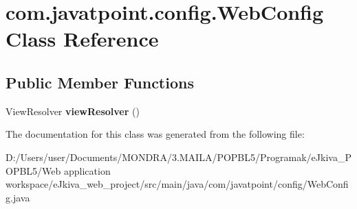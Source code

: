 \hypertarget{classcom_1_1javatpoint_1_1config_1_1_web_config}{}\section{com.\+javatpoint.\+config.\+Web\+Config Class Reference}
\label{classcom_1_1javatpoint_1_1config_1_1_web_config}
\subsection*{Public Member Functions}
\begin{DoxyCompactItemize}
\item 
\mbox{\label{classcom_1_1javatpoint_1_1config_1_1_web_config_a551aad4a469e5aad3415097348174049}} 
View\+Resolver {\bfseries view\+Resolver} ()
\end{DoxyCompactItemize}


The documentation for this class was generated from the following file\+:\begin{DoxyCompactItemize}
\item 
D\+:/\+Users/user/\+Documents/\+M\+O\+N\+D\+R\+A/3.\+M\+A\+I\+L\+A/\+P\+O\+P\+B\+L5/\+Programak/e\+Jkiva\+\_\+\+P\+O\+P\+B\+L5/\+Web application workspace/e\+Jkiva\+\_\+web\+\_\+project/src/main/java/com/javatpoint/config/Web\+Config.\+java\end{DoxyCompactItemize}
